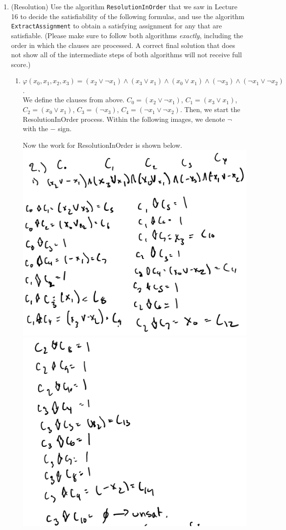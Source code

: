 \documentclass[11pt]{article}
\begin{document}
\begin{enumerate}
\item (Resolution) Use the algorithm \texttt{ResolutionInOrder} that we saw in Lecture 16 to decide the satisfiability of the following formulas, and use the algorithm \texttt{ExtractAssignment} to obtain a satisfying assignment for any that are satisfiable. (Please make sure to follow both algorithms \textit{exactly}, including the order in which the clauses are processed. A correct final solution that does not show all of the intermediate steps of both algorithms will not receive full score.)
  
  \begin{enumerate}
      \item $\varphi(x_0, x_1, x_2, x_3) = (x_2 \vee \neg x_1) \wedge (x_3 \vee x_1) \wedge (x_0 \vee x_1) \wedge (\neg x_3) \wedge (\neg x_1 \vee \neg x_2)$. \\
      
      We define the clauses from above. $C_0 = (x_2 \vee \neg x_1)$, $C_1 = (x_3 \vee x_1)$, $C_2 = (x_0 \vee x_1)$, $C_3 = (\neg x_3)$, $C_4 = (\neg x_1 \vee \neg x_2)$. Then, we start the ResolutionInOrder process. Within the following images, we denote $\neg$ with the $-$ sign.
      
      Now the work for ResolutionInOrder is shown below. \\
      \includegraphics[width=.6\textwidth]{fall2022/psets/ps7/IMG_0015.jpg} \\
      \includegraphics[width=.6\textwidth]{fall2022/psets/ps7/IMG_0016.jpg} \\
      

\end{enumerate}
\end{enumerate}
\end{document}
